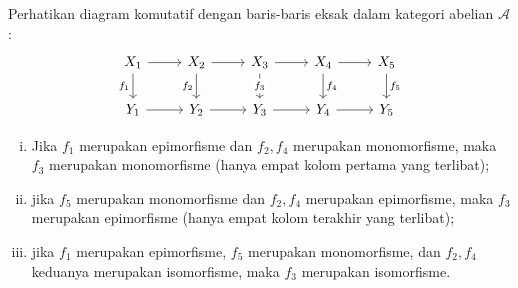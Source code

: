 \begin{proposisi}\label{prop:5-lemma}
	Perhatikan diagram komutatif dengan baris-baris eksak dalam kategori
	abelian $\mathcal{A}$:
	\[\begin{tikzcd}
		X_1 \arrow[r] \arrow[d, "f_1"'] & X_2 \arrow[r] \arrow[d, "f_2"'] & X_3 \arrow[r] \arrow[d, "f_3" description] & X_4 \arrow[r] \arrow[d, "f_4"] & X_5 \arrow[d, "f_5"] \\
		Y_1 \arrow[r] & Y_2 \arrow[r] & Y_3 \arrow[r] & Y_4 \arrow[r] & Y_5
	\end{tikzcd}\]
	\begin{enumerate}[(i)]
		\item Jika $f_1$ merupakan epimorfisme dan $f_2, f_4$ merupakan
		monomorfisme, maka $f_3$ merupakan monomorfisme (hanya empat kolom
		pertama yang terlibat);
		\item jika $f_5$ merupakan monomorfisme dan $f_2, f_4$ merupakan
		epimorfisme, maka $f_3$ merupakan epimorfisme (hanya empat kolom
		terakhir yang terlibat);
		\item jika $f_1$ merupakan epimorfisme, $f_5$ merupakan monomorfisme,
		dan $f_2, f_4$ keduanya merupakan isomorfisme, maka $f_3$ merupakan
		isomorfisme.
	\end{enumerate}
\end{proposisi}
